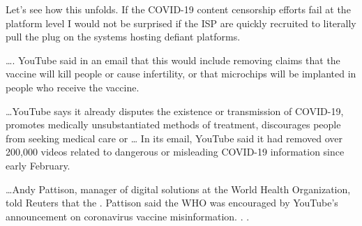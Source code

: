 \begin{refsection}
Let's see how this unfolds. If the COVID-19 content censorship efforts fail at the platform level I would not be surprised if the ISP are quickly recruited to literally pull the plug on the systems hosting defiant platforms.

\begin{tcolorbox}[quote]

\dots{}. YouTube said in an email that this would include removing claims that the vaccine will kill people or cause infertility, or that microchips will be implanted in people who receive the vaccine.\textsuperscript{\cite{url5ae80da6}}

\end{tcolorbox}

\begin{tcolorbox}[quote]

\dots{}YouTube says it already  disputes the existence or transmission of COVID-19, promotes medically unsubstantiated methods of treatment, discourages people from seeking medical care or \dots{} In its email, YouTube said it had removed over 200,000 videos related to dangerous or misleading COVID-19 information since early February.\textsuperscript{\cite{url5ae80da6}}

\end{tcolorbox}

\begin{tcolorbox}[quote]

\dots{}Andy Pattison, manager of digital solutions at the World Health Organization, told Reuters that the . Pattison said the WHO was encouraged by YouTube's announcement on coronavirus vaccine misinformation. . .\textsuperscript{\cite{url5ae80da6}}

\end{tcolorbox}

\printbibliography[heading=subbibliography]

\end{refsection}